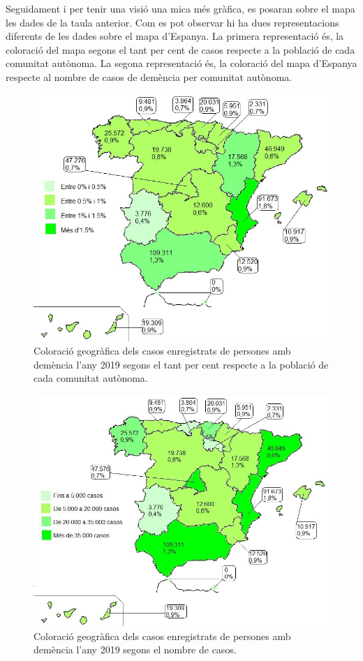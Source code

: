 \documentclass[a4paper,12pt]{article}
\begin{document}
Seguidament i per tenir una visió una mica més gràfica, es posaran sobre el mapa les dades de la taula anterior. Com es pot observar hi ha dues representacions diferents de les dades sobre el mapa d'Espanya. La primera representació és, la coloració del mapa segons el tant per cent de casos respecte a la població de cada comunitat autònoma. La segona representació és, la coloració del mapa d'Espanya respecte al nombre de casos de demència per comunitat autònoma.
\begin{figure}[H]
    \centering
    \includegraphics[scale = 0.6]{images/distribucio territorial en base a percentatge.jpg}
    \caption{Coloració geogràfica dels casos enregistrats de persones amb demència l'any 2019 segons el tant per cent respecte a la població de cada comunitat autònoma.}
    \label{fig:colorpercent}
\end{figure}
\begin{figure}[H]
    \centering
    \includegraphics[scale = 0.6]{images/distribucio territorial en base a casos.jpg}
    \caption{Coloració geogràfica dels casos enregistrats de persones amb demència l'any 2019 segons el nombre de casos.}
    \label{fig:colorcasos}
\end{figure}
\end{document}

